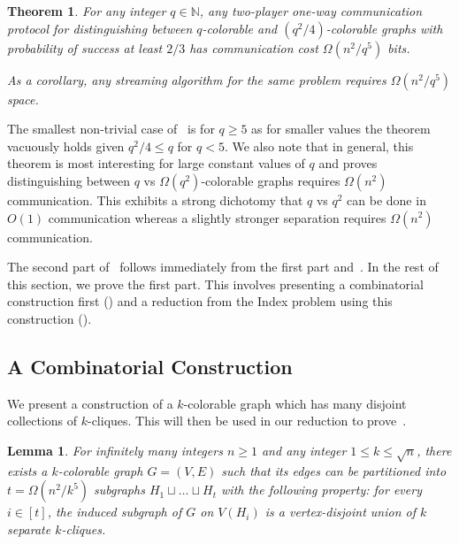 \documentclass[11pt]{article}
\newtheorem{theorem}{Theorem}
\newtheorem{lemma}{Lemma}[section]
\theoremstyle{definition}
\renewcommand{\leq}{\leqslant}
\renewcommand{\geq}{\geqslant}
\newcommand{\IN}{\ensuremath{\mathbb{N}}}
\begin{document}
\begin{theorem}\label{thm:two-player}
	For any integer $q \in \IN$, any two-player one-way communication protocol for distinguishing between $q$-colorable and $(q^2/4)$-colorable graphs with probability of success at least $2/3$ 
	has communication cost $\Omega(n^2/q^5)$ bits. 
	
	As a corollary, any streaming algorithm for the same problem requires $\Omega(n^2/q^5)$ space. 
\end{theorem}
The smallest non-trivial case of~ is for $q \geq 5$ as for smaller values the theorem vacuously holds given $q^2/4 \leq q$ for $q < 5$. We also note that in general, this theorem is most
interesting for large constant values of $q$ and proves distinguishing between $q$ vs $\Omega(q^2)$-colorable graphs requires $\Omega(n^2)$ communication. This exhibits a strong dichotomy that $q$ vs $q^2$ can be 
done in $O(1)$ communication whereas a slightly stronger separation requires $\Omega(n^2)$ communication. 

The second part of~ follows immediately from the first part and~. In the rest of this section, we prove the first part. This involves presenting a combinatorial 
construction first () and a reduction from the Index problem using this construction (). 



\newcommand{\Li}[1]{\ensuremath{L^{(#1)}}\xspace}
\newcommand{\vij}[2]{\ensuremath{v^{(#1,#2)}}\xspace}


\subsection{A Combinatorial Construction}\label{sec:simple-cluster-packing}

We present a construction of a $k$-colorable graph which has many disjoint collections of $k$-cliques. This will then be used in our reduction to prove~. 

\begin{lemma}\label{lem:graph-simple}
	For infinitely many integers $n \geq 1$ and any integer $1 \leq k \leq \sqrt{n}$, there exists a $k$-colorable graph $G=(V,E)$ such that its edges can be partitioned into $t = \Omega(n^2/k^5)$ subgraphs $H_1 \sqcup \ldots \sqcup H_t$
	with the following property: for every $i \in [t]$, the induced subgraph of $G$ on $V(H_i)$ is a vertex-disjoint union of $k$ separate $k$-cliques. 
\end{lemma}
\end{document}
